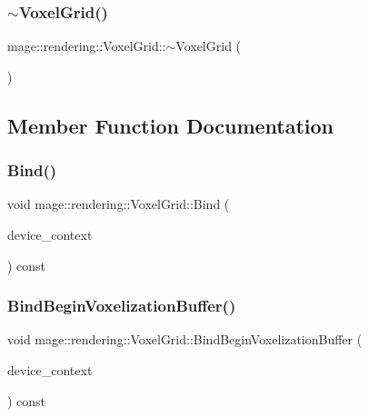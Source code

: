 \subsubsection{\texorpdfstring{$\sim$\+Voxel\+Grid()}{~VoxelGrid()}}
{\footnotesize\ttfamily mage\+::rendering\+::\+Voxel\+Grid\+::$\sim$\+Voxel\+Grid (\begin{DoxyParamCaption}{ }\end{DoxyParamCaption})\hspace{0.3cm}{\ttfamily [default]}}



\subsection{Member Function Documentation}
\hypertarget{classmage_1_1rendering_1_1_voxel_grid_ade7ea8a797334ceb16d55a3d1d83299a}{}\label{classmage_1_1rendering_1_1_voxel_grid_ade7ea8a797334ceb16d55a3d1d83299a} 
\subsubsection{\texorpdfstring{Bind()}{Bind()}}
{\footnotesize\ttfamily void mage\+::rendering\+::\+Voxel\+Grid\+::\+Bind (\begin{DoxyParamCaption}\item[{I\+D3\+D11\+Device\+Context \&}]{device\+\_\+context }\end{DoxyParamCaption}) const\hspace{0.3cm}{\ttfamily [noexcept]}}

\hypertarget{classmage_1_1rendering_1_1_voxel_grid_a52254c5709b77d6c348eb15b782b5bc4}{}\label{classmage_1_1rendering_1_1_voxel_grid_a52254c5709b77d6c348eb15b782b5bc4} 
\subsubsection{\texorpdfstring{Bind\+Begin\+Voxelization\+Buffer()}{BindBeginVoxelizationBuffer()}}
{\footnotesize\ttfamily void mage\+::rendering\+::\+Voxel\+Grid\+::\+Bind\+Begin\+Voxelization\+Buffer (\begin{DoxyParamCaption}\item[{I\+D3\+D11\+Device\+Context \&}]{device\+\_\+context }\end{DoxyParamCaption}) const\hspace{0.3cm}{\ttfamily [noexcept]}}

